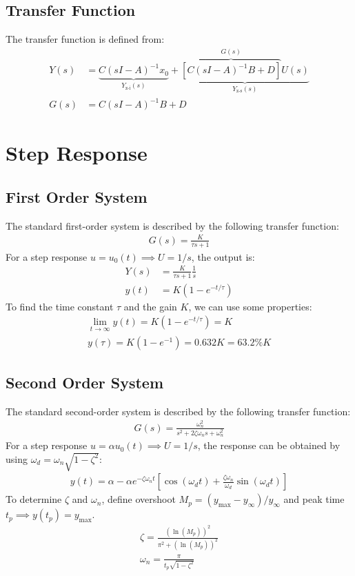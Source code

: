 \documentclass[letterpaper,12pt]{article}
\begin{document}
\subsection{Transfer Function}
The transfer function is defined from:
\begin{align*}
    Y(s) &= \underbrace{C (sI - A)^{-1} x_0}_{Y_{\text{z-i}}(s)} + \underbrace{\overbrace{[C(sI - A)^{-1} B + D]}^{G(s)} U(s)}_{Y_{\text{z-s}}(s)} \\
    G(s) &= C(sI - A)^{-1}B + D
\end{align*}

\section{Step Response}
\subsection{First Order System}
The standard first-order system is described by the following transfer function:
\begin{align*}
    G(s) = \frac{K}{\tau s + 1}
\end{align*}
For a step response $u = u_{0}(t)\implies U = 1/s$, the output is:
\begin{align*}
    Y(s) &= \frac{K}{\tau s + 1} \frac{1}{s} \\
    y(t) &= K(1 - e^{-t/\tau})
\end{align*}
To find the time constant $\tau$ and the gain $K$, we can use some properties:
\begin{align*}
    \lim_{t\to\infty} y(t) = K(1 - e^{-t/\tau}) = K \\
    y(\tau) = K(1 - e^{-1}) = 0.632K = 63.2\%K
\end{align*}
\subsection{Second Order System}
The standard second-order system is described by the following transfer function:
\begin{align*}
    G(s) = \frac{\omega_n^2}{s^2 + 2\zeta\omega_n s + \omega_n^2}
\end{align*}
For a step response $u = \alpha u_{0}(t)\implies U = 1/s$, the response can be obtained
by using $\omega_d = \omega_n\sqrt{1 - \zeta^2}$:
\begin{align*}
    y(t) = \alpha - \alpha e^{-\zeta\omega_n t}\left[\cos(\omega_d t) +
     \frac{\zeta \omega_n}{\omega_d}\sin(\omega_d t)\right]
\end{align*}
To determine $\zeta$ and $\omega_n$, define overshoot $M_p = (y_{\text{max}} -
y_{\infty})/y_{\infty}$ and peak time $t_p \implies y(t_p) = y_{\text{max}}$.
\begin{align*}
    \zeta = \frac{(\ln(M_p))^2}{\pi^2 + (\ln(M_p))^2} \\
    \omega_n = \frac{\pi}{t_p\sqrt{1 - \zeta^2}}
\end{align*}
\end{document}
